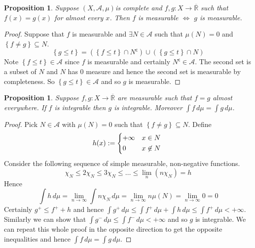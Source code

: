 \documentclass[11pt]{article}
\newcommand{\defeq}{:=}
\newcommand{\msrspc}{\ensuremath{(X,\mathcal{A},\mu)}}
\newcommand{\dm}{\ensuremath{\,d\mu}}
\newcommand{\stcmp}{^{\mathsf{c}}}
\newcommand{\R}{\mathbb{R}}
\newcommand{\Rb}{\overline{\R}}
\newtheorem{prop}[theorem]{Proposition}
\begin{document}
\begin{prop}
	Suppose \msrspc is complete and $f,g:X\to\Rb$ such that $f(x)=g(x)$ for almost every $x$. Then $f$ is measurable $\iff$ $g$ is measurable.	
\end{prop}
\begin{proof}
Suppose that $f$ is measurable and $\exists N \in\mathcal{A}$ such that $\mu(N)=0$ and $\left\{f\neq g\right\}\subseteq N$.
\[
	\left\{g \leq t \right\} = \left(\left\{f \leq t \right\}\cap N\stcmp\right) \cup \left(\left\{g\leq t\right\}\cap N\right)
\]
Note $\left\{f \leq t\right\}\in\mathcal{A}$ since $f$ is measurable and certainly $N\stcmp\in\mathcal{A}$.
The second set is a subset of $N$ and $N$ has 0 measure and hence the second set is measurable by completeness.
So $\left\{g \leq t\right\}\in\mathcal{A}$ and so $g$ is measurable.
\end{proof}
\begin{prop}
Suppose $f, g:X\to\Rb$ are measurable such that $f=g$ almost everywhere.	
If $f$ is integrable then $g$ is integrable.
Moreover $\int f \dm = \int g \dm$.
\end{prop}
\begin{proof}
Pick $N\in\mathcal{A}$ with $\mu(N)=0$ such that $\left\{f \neq g\right\}\subseteq N$.
Define
\[
	h(x)\defeq
	\begin{cases*}
		+\infty & $x\in N$\\
		0       & $x\not\in N$
	\end{cases*}
\]
Consider the following sequence of simple measurable, non-negative functions.
\[
	\chi_N \leq 2 \chi_N \leq 3 \chi_N \leq \dots \leq \lim_n(n\chi_N) = h
\]
Hence
\[
	\int h \dm = \lim_{n\to\infty}\int n\chi_N \dm = \lim_{n\to\infty}n \mu (N) = \lim_{n\to\infty}0 = 0
\]
Certainly $g^+\leq f^+ +h$ and hence $\int g^+ \dm \leq \int f^+ \dm + \int h \dm \leq \int f^+ \dm < + \infty$.
Similarly we can show that $\int g^- \dm \leq \int f^- \dm < +\infty$ and so $g$ is integrable.
We can repeat this whole proof in the opposite direction to get the opposite inequalities and hence $\int f \dm = \int g \dm$.
\end{proof}
\end{document}

